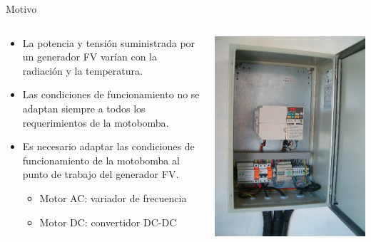 \documentclass[xcolor={usenames,svgnames,dvipsnames}]{beamer}
\begin{document}
\begin{frame}[plain,label={sec:orgbed4c59}]{Motivo}
\begin{columns}
\begin{column}{0.8\columnwidth}
\begin{itemize}
\item La \alert{potencia y tensión suministrada por un generador FV varían} con la radiación y la temperatura.

\item Las condiciones de funcionamiento \alert{no se adaptan siempre a todos los requerimientos de la motobomba}.

\item Es necesario adaptar las condiciones de funcionamiento de la motobomba al punto de trabajo del generador FV.

\begin{itemize}
\item \alert{Motor AC: variador de frecuencia}

\item \alert{Motor DC: convertidor DC-DC}
\end{itemize}
\end{itemize}
\end{column}

\begin{column}{0.4\columnwidth}
\begin{center}
\includegraphics[width=.9\linewidth]{../figs/VariadorFrecuencia.jpg}
\end{center}
\end{column}
\end{columns}
\end{frame}
\end{document}
